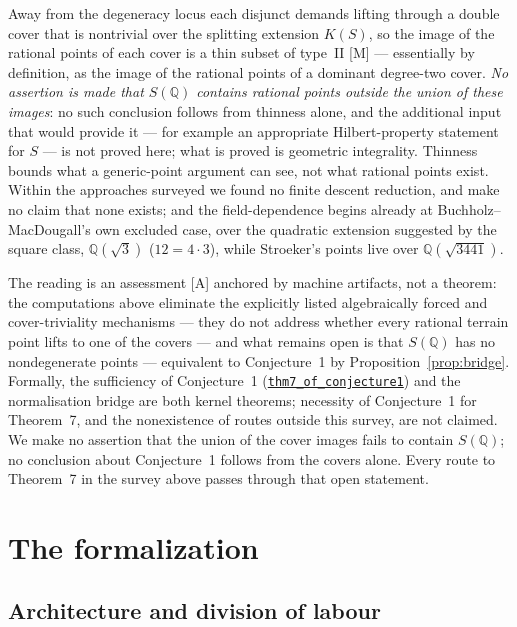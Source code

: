 \documentclass[11pt]{amsart}
\newcommand{\Q}{\mathbb{Q}}
\newcommand{\repourl}{https://github.com/hirokifukui/rd-quartics-classification}
\newcommand{\repotag}{v1.1.0}
\newcommand{\leanline}[3]{\href{\repourl/blob/\repotag/#1\#L#2}{\texttt{#3}}}
\begin{document}
Away from the degeneracy locus each disjunct demands lifting through a
double cover that is nontrivial over the splitting extension $K(S)$, so
the image of the rational points of each cover is a thin subset of
type~II [M] --- essentially by definition, as the image of the rational
points of a dominant degree-two cover.  \emph{No assertion is made that
$S(\Q)$ contains rational points outside the union of these images}:
no such conclusion follows from thinness alone, and the additional
input that would provide it --- for example an appropriate
Hilbert-property statement for $S$ --- is not proved here; what is
proved is geometric integrality.  Thinness bounds what a generic-point argument can see,
not what rational points exist.  Within the approaches surveyed we
found no finite descent reduction, and make no claim that none exists;
and the field-dependence begins
already at Buchholz--MacDougall's own excluded case, over the quadratic
extension suggested by the square class, $\Q(\sqrt{3})$
($12=4\cdot 3$), while Stroeker's points live over $\Q(\sqrt{3441})$.

The reading is an assessment [A] anchored by machine artifacts, not a
theorem: the computations above eliminate the explicitly listed
algebraically forced and cover-triviality mechanisms --- they do not
address whether every rational terrain point lifts to one of the
covers --- and what remains open is that
$S(\Q)$ has no nondegenerate points --- equivalent to Conjecture~1 by
Proposition~\ref{prop:bridge}.  Formally, the sufficiency of
Conjecture~1
(\leanline{Gap/BMThm7Transcript.lean}{1002}{thm7\_of\_conjecture1})
and the normalisation bridge are both kernel theorems; necessity of
Conjecture~1 for Theorem~7, and the nonexistence of routes outside this
survey, are not claimed.  We make no assertion that the union of the
cover images fails to contain $S(\Q)$; no conclusion about
Conjecture~1 follows from the covers alone.  Every route to Theorem~7
in the survey above passes through that open statement.

\section{The formalization}\label{sec:formal}

\subsection{Architecture and division of labour}\label{sec:formal:arch}
\end{document}

